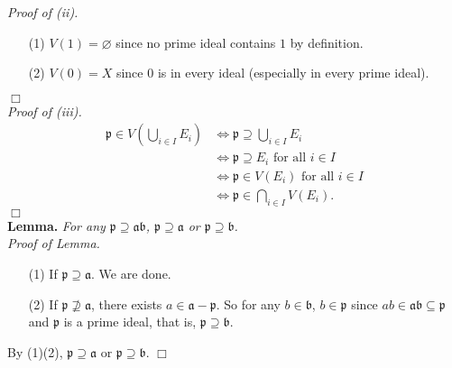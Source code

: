 \documentclass{article}
\begin{document}
\emph{Proof of (ii).}
\begin{enumerate}
\item[(1)]
\emph{$V(1) = \varnothing$} since no prime ideal contains $1$ by definition.
\item[(2)]
\emph{$V(0) = X$} since $0$ is in every ideal (especially in every prime ideal).
\end{enumerate}
$\Box$ \\

\emph{Proof of (iii).}
\begin{align*}
\mathfrak{p} \in V\left( \bigcup_{i \in I}E_i \right)
&\Longleftrightarrow \mathfrak{p} \supseteq \bigcup_{i \in I}E_i \\
&\Longleftrightarrow \mathfrak{p} \supseteq E_i \text{ for all } i \in I \\
&\Longleftrightarrow \mathfrak{p} \in V(E_i) \text{ for all } i \in I \\
&\Longleftrightarrow \mathfrak{p} \in \bigcap_{i \in I} V(E_i).
\end{align*}
$\Box$ \\

\textbf{Lemma.}
\emph{For any $\mathfrak{p} \supseteq \mathfrak{a} \mathfrak{b}$,
$\mathfrak{p} \supseteq \mathfrak{a}$ or $\mathfrak{p} \supseteq \mathfrak{b}$.} \\

\emph{Proof of Lemma.}
\begin{enumerate}
\item[(1)] If $\mathfrak{p} \supseteq \mathfrak{a}$. We are done.
\item[(2)] If $\mathfrak{p} \not\supseteq \mathfrak{a}$,
there exists $a \in \mathfrak{a} - \mathfrak{p}$.
So for any $b \in \mathfrak{b}$, $b \in \mathfrak{p}$
since $ab \in \mathfrak{ab} \subseteq \mathfrak{p}$ and $\mathfrak{p}$ is a prime ideal,
that is, $\mathfrak{p} \supseteq \mathfrak{b}$.
\end{enumerate}
By (1)(2), $\mathfrak{p} \supseteq \mathfrak{a}$ or $\mathfrak{p} \supseteq \mathfrak{b}$.
$\Box$ \\
\end{document}

